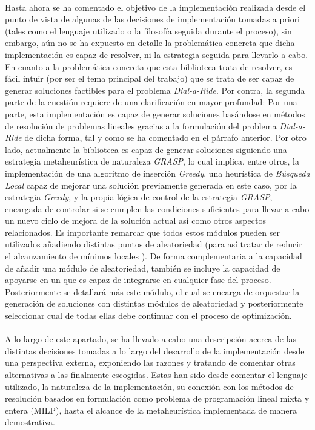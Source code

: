 \documentclass{subfiles}
\begin{document}
        \paragraph{}
        Hasta ahora se ha comentado el objetivo de la implementación realizada desde el punto de vista de algunas de las decisiones de implementación tomadas a priori (tales como el lenguaje utilizado o la filosofía seguida durante el proceso), sin embargo, aún no se ha expuesto en detalle la problemática concreta que dicha implementación es capaz de resolver, ni la estrategia seguida para llevarlo a cabo. En cuanto a la problemática concreta que esta biblioteca trata de resolver, es fácil intuir (por ser el tema principal del trabajo) que se trata de ser capaz de generar soluciones factibles para el problema \emph{Dial-a-Ride}. Por contra, la segunda parte de la cuestión requiere de una clarificación en mayor profundad: Por una parte, esta implementación es capaz de generar soluciones basándose en métodos de resolución de problemas lineales gracias a la formulación del problema \emph{Dial-a-Ride} de dicha forma, tal y como se ha comentado en el párrafo anterior. Por otro lado, actualmente la biblioteca es capaz de generar soluciones siguiendo una estrategia metaheurística de naturaleza \emph{GRASP}, lo cual implica, entre otros, la implementación de una algoritmo de inserción \emph{Greedy}, una heurística de \emph{Búsqueda Local} capaz de mejorar una solución previamente generada en este caso, por la estrategia \emph{Greedy}, y la propia lógica de control de la estrategia \emph{GRASP}, encargada de controlar si se cumplen las condiciones suficientes para llevar a cabo un nuevo ciclo de mejora de la solución actual así como otros aspectos relacionados. Es importante remarcar que todos estos módulos pueden ser utilizados añadiendo distintas puntos de aleatoriedad (para así tratar de reducir el alcanzamiento de mínimos locales ). De forma complementaria a la capacidad de añadir una módulo de aleatoriedad, también se incluye la capacidad de apoyarse en un  que es capaz de integrarse en cualquier fase del proceso. Posteriormente se detallará más este módulo, el cual se encarga de orquestar la generación de soluciones con distintas módulos de aleatoriedad y posteriormente seleccionar cual de todas ellas debe continuar con el proceso de optimización.

        \paragraph{}
        A lo largo de este apartado, se ha llevado a cabo una descripción acerca de las distintas decisiones tomadas a lo largo del desarrollo de la implementación desde una perspectiva externa, exponiendo las razones y tratando de comentar otras alternativas a las finalmente escogidas. Estas han sido desde comentar el lenguaje utilizado, la naturaleza de la implementación, su conexión con los métodos de resolución basados en formulación como problema de programación lineal mixta y entera (MILP), hasta el alcance de la metaheurística implementada de manera demostrativa.
\end{document}
